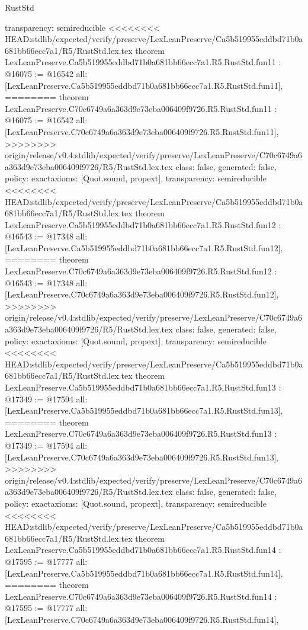 \begin{lexlean}{RustStd}
\begin{coremodule}
{\begin{coremodule}
{{{{{{{{{{{{{{  transparency: semireducible
}
<<<<<<<< HEAD:stdlib/expected/verify/preserve/LexLeanPreserve/Ca5b519955eddbd71b0a681bb66ecc7a1/R5/RustStd.lex.tex
theorem LexLeanPreserve.Ca5b519955eddbd71b0a681bb66ecc7a1.R5.RustStd.fun11 : @16075 := @16542 {
  all: [LexLeanPreserve.Ca5b519955eddbd71b0a681bb66ecc7a1.R5.RustStd.fun11],
========
theorem LexLeanPreserve.C70c6749a6a363d9e73eba006409f9726.R5.RustStd.fun11 : @16075 := @16542 {
  all: [LexLeanPreserve.C70c6749a6a363d9e73eba006409f9726.R5.RustStd.fun11],
>>>>>>>> origin/release/v0.4:stdlib/expected/verify/preserve/LexLeanPreserve/C70c6749a6a363d9e73eba006409f9726/R5/RustStd.lex.tex
  class: false,
  generated: false,
  policy: exact{axioms: [Quot.sound, propext]},
  transparency: semireducible
}
<<<<<<<< HEAD:stdlib/expected/verify/preserve/LexLeanPreserve/Ca5b519955eddbd71b0a681bb66ecc7a1/R5/RustStd.lex.tex
theorem LexLeanPreserve.Ca5b519955eddbd71b0a681bb66ecc7a1.R5.RustStd.fun12 : @16543 := @17348 {
  all: [LexLeanPreserve.Ca5b519955eddbd71b0a681bb66ecc7a1.R5.RustStd.fun12],
========
theorem LexLeanPreserve.C70c6749a6a363d9e73eba006409f9726.R5.RustStd.fun12 : @16543 := @17348 {
  all: [LexLeanPreserve.C70c6749a6a363d9e73eba006409f9726.R5.RustStd.fun12],
>>>>>>>> origin/release/v0.4:stdlib/expected/verify/preserve/LexLeanPreserve/C70c6749a6a363d9e73eba006409f9726/R5/RustStd.lex.tex
  class: false,
  generated: false,
  policy: exact{axioms: [Quot.sound, propext]},
  transparency: semireducible
}
<<<<<<<< HEAD:stdlib/expected/verify/preserve/LexLeanPreserve/Ca5b519955eddbd71b0a681bb66ecc7a1/R5/RustStd.lex.tex
theorem LexLeanPreserve.Ca5b519955eddbd71b0a681bb66ecc7a1.R5.RustStd.fun13 : @17349 := @17594 {
  all: [LexLeanPreserve.Ca5b519955eddbd71b0a681bb66ecc7a1.R5.RustStd.fun13],
========
theorem LexLeanPreserve.C70c6749a6a363d9e73eba006409f9726.R5.RustStd.fun13 : @17349 := @17594 {
  all: [LexLeanPreserve.C70c6749a6a363d9e73eba006409f9726.R5.RustStd.fun13],
>>>>>>>> origin/release/v0.4:stdlib/expected/verify/preserve/LexLeanPreserve/C70c6749a6a363d9e73eba006409f9726/R5/RustStd.lex.tex
  class: false,
  generated: false,
  policy: exact{axioms: [Quot.sound, propext]},
  transparency: semireducible
}
<<<<<<<< HEAD:stdlib/expected/verify/preserve/LexLeanPreserve/Ca5b519955eddbd71b0a681bb66ecc7a1/R5/RustStd.lex.tex
theorem LexLeanPreserve.Ca5b519955eddbd71b0a681bb66ecc7a1.R5.RustStd.fun14 : @17595 := @17777 {
  all: [LexLeanPreserve.Ca5b519955eddbd71b0a681bb66ecc7a1.R5.RustStd.fun14],
========
theorem LexLeanPreserve.C70c6749a6a363d9e73eba006409f9726.R5.RustStd.fun14 : @17595 := @17777 {
  all: [LexLeanPreserve.C70c6749a6a363d9e73eba006409f9726.R5.RustStd.fun14],
}}}}}}}}}}}}}}}}}}
\end{coremodule}}
\end{coremodule}
\end{lexlean}
